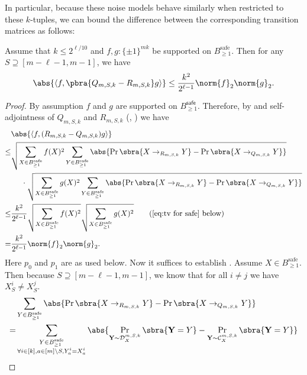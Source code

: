 In particular, because these noise models behave similarly when restricted to these $k$-tuples, we can bound the difference between the corresponding transition matrices as follows:

\begin{lemma}\label{lem:R to Q hybrid local}
    Assume that $k\leq 2^{\ell/10}$ and $f,g:\{\pm1\}^{mk}$ be supported on $B_{\geq 1}^{\mathrm{safe}}$. Then for any $S\supseteq [m-\ell-1,m-1]$, we have
    \begin{align*}
        \abs{\left\langle f,\pbra{Q_{m,S,k}-R_{m,S,k}}g\right\rangle}\leq \frac{k^2}{2^{\ell-1}}\norm{f}_2\norm{g}_2.
    \end{align*}
\end{lemma}
\begin{proof}
    By assumption $f$ and $g$ are supported on $B_{\geq1}^{\mathsf{safe}}$. Therefore, by  and self-adjointness of $Q_{m,S,k}$ and $R_{m,S,k}$ (, ) we have
    \begin{align*}
        &\abs{\left\langle f,(R_{m,S,k}-Q_{m,S,k})g\right\rangle}\\
        \leq & \sqrt{\sum_{X\in B_{\geq 1}^{\mathrm{safe}}}f(X)^2\sum_{Y\in B_{\geq 1}^{\mathrm{safe}}}\abs{\Pr\sbra{X\to_{R_{m,S,k}} Y}-\Pr\sbra{X\to_{Q_{m,S,k}} Y}}}\\
        &\;\;\;\;\;\cdot\sqrt{\sum_{X\in B_{\geq 1}^{\mathrm{safe}}}g(X)^2\sum_{Y\in B_{\geq 1}^{\mathrm{safe}}}\abs{\Pr\sbra{X\to_{R_{m,S,k}} Y}-\Pr\sbra{X\to_{Q_{m,S,k}} Y}}}\\
        \leq & \frac{k^2}{2^{\ell-1}}\sqrt{\sum_{X\in B_{\geq 1}^{\mathrm{safe}}}f(X)^2}\sqrt{\sum_{X\in B_{\geq 1}^{\mathrm{safe}}}g(X)^2}\tag{\Cref{eq:tv for safe} below}\\
        =& \frac{k^2}{2^{\ell-1}}\norm{f}_2\norm{g}_2.
    \end{align*}
Here $p_0$ and $p_1$ are as used below. Now it suffices to establish . Assume $X\in B_{\geq 1}^{\mathrm{safe}}$. Then because $S\supseteq [m-\ell-1,m-1]$, we know that for all $i\neq j$ we have $X^i_{S}\neq X^j_S$.
\begin{align*}
    &\sum_{Y\in B_{\geq 1}^{\mathrm{safe}}}\abs{\Pr\sbra{X\to_{R_{m,S,k}} Y}-\Pr\sbra{X\to_{Q_{m,S,k}} Y}}\\
    =&\sum_{\substack{Y\in B_{\geq 1}^{\mathrm{safe}}\\\forall i\in[k], a\in [m]\setminus S, Y^i_a=X^i_a}}\abs{\Pr_{\mathbf{Y}\sim\mathcal{D}^{m,S,k}_X}\sbra{\mathbf{Y}=Y}- \Pr_{\mathbf{Y}\sim\mathcal{C}^{m,S,k}_X}\sbra{\mathbf{Y}=Y}}\\

\end{align*}
\end{proof}
